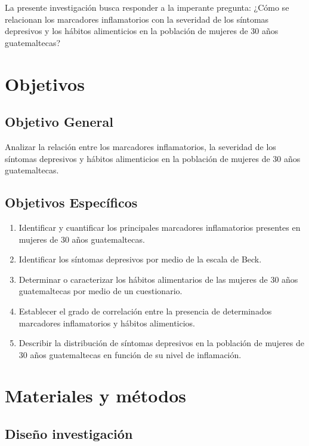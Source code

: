 \documentclass[jou]{apa7}
\begin{document}
	La presente investigación busca responder a la imperante pregunta: ¿Cómo
	se relacionan los marcadores inflamatorios con la severidad de los
	síntomas depresivos y los hábitos alimenticios en la población de
	mujeres de 30 años guatemaltecas?
	
	\section{Objetivos}\label{objetivos}
	
	\subsection{Objetivo
		General}\label{objetivo-general}
	
	Analizar la relación entre los marcadores inflamatorios, la severidad de
	los síntomas depresivos y hábitos alimenticios en la población de
	mujeres de 30 años guatemaltecas.
	
	\subsection{Objetivos Específicos}\label{objetivos-especuxedficos}
	
	\begin{enumerate}
		\item Identificar y cuantificar los principales marcadores inflamatorios presentes en mujeres de 30 años guatemaltecas.
		\item Identificar los síntomas depresivos por medio de la escala de Beck.
		\item Determinar o caracterizar los hábitos alimentarios de las mujeres de 30 años guatemaltecas por medio de un cuestionario.
		\item Establecer el grado de correlación entre la presencia de determinados marcadores inflamatorios y hábitos alimenticios.
		\item Describir la distribución de síntomas depresivos en la población de mujeres de 30 años guatemaltecas en función de su nivel de inflamación.
	\end{enumerate}
	
	
	\section{Materiales y métodos}\label{materiales-y-muxe9todos}
	
	\subsection{Diseño investigación}\label{diseuxf1o-investigaciuxf3n}
	
\end{document}
